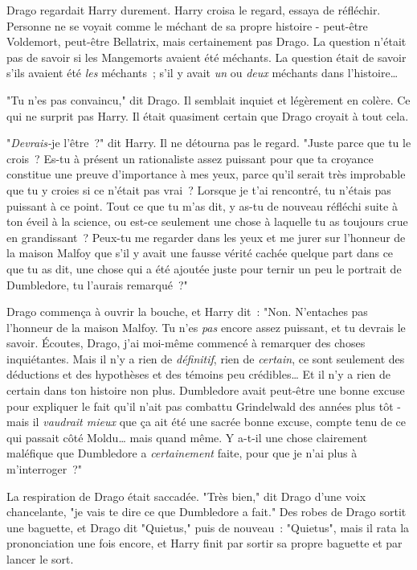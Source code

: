 Drago regardait Harry durement. Harry croisa le regard, essaya de réfléchir. Personne ne se voyait comme le méchant de sa propre histoire - peut-être Voldemort, peut-être Bellatrix, mais certainement pas Drago. La question n'était pas de savoir si les Mangemorts avaient été méchants. La question était de savoir s'ils avaient été \emph{les} méchants~; s'il y avait \emph{un} ou \emph{deux} méchants dans l'histoire…

"Tu n'es pas convaincu," dit Drago. Il semblait inquiet et légèrement en colère. Ce qui ne surprit pas Harry. Il était quasiment certain que Drago croyait à tout cela.

"\emph{Devrais-}je l'être~?" dit Harry. Il ne détourna pas le regard. "Juste parce que tu le crois~? Es-tu à présent un rationaliste assez puissant pour que ta croyance constitue une preuve d'importance à mes yeux, parce qu'il serait très improbable que tu y croies si ce n'était pas vrai~? Lorsque je t'ai rencontré, tu n'étais pas puissant à ce point. Tout ce que tu m'as dit, y as-tu de nouveau réfléchi suite à ton éveil à la science, ou est-ce seulement une chose à laquelle tu as toujours crue en grandissant~? Peux-tu me regarder dans les yeux et me jurer sur l'honneur de la maison Malfoy que s'il y avait une fausse vérité cachée quelque part dans ce que tu as dit, une chose qui a été ajoutée juste pour ternir un peu le portrait de Dumbledore, tu l'aurais remarqué~?"

Drago commença à ouvrir la bouche, et Harry dit~: "Non. N'entaches pas l'honneur de la maison Malfoy. Tu n'es \emph{pas} encore assez puissant, et tu devrais le savoir. Écoutes, Drago, j'ai moi-même commencé à remarquer des choses inquiétantes. Mais il n'y a rien de \emph{définitif}, rien de \emph{certain}, ce sont seulement des déductions et des hypothèses et des témoins peu crédibles… Et il n'y a rien de certain dans ton histoire non plus. Dumbledore avait peut-être une bonne excuse pour expliquer le fait qu'il n'ait pas combattu Grindelwald des années plus tôt - mais il \emph{vaudrait mieux} que ça ait été une sacrée bonne excuse, compte tenu de ce qui passait côté Moldu… mais quand même. Y a-t-il une chose clairement maléfique que Dumbledore a \emph{certainement} faite, pour que je n'ai plus à m'interroger~?"

La respiration de Drago était saccadée. "Très bien," dit Drago d'une voix chancelante, "je vais te dire ce que Dumbledore a fait." Des robes de Drago sortit une baguette, et Drago dit "Quietus," puis de nouveau~: "Quietus", mais il rata la prononciation une fois encore, et Harry finit par sortir sa propre baguette et par lancer le sort.

